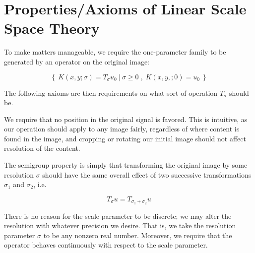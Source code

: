     \section{Properties/Axioms of Linear Scale Space Theory}
	 To make matters manageable, we require the one-parameter family to be generated by an operator on the original image:
	 
	\begin{equation}
		\left\{\ K(x,y;\sigma) = T_\sigma u_0
		\ \lvert \ 
		\sigma \ge 0
		\; ,\; K(x,y,;0) = u_0
		\ \right\} 
	\end{equation}
    
	The following axioms are then requirements on what sort of operation $T_\sigma$ should be.
		
    \begin{axiom}
    	\label{axiom:linear-shift-and-rotation}
    We require that no position in the original signal is favored.  This is intuitive, as our operation should apply to any image fairly, regardless of where content is found in the image, and cropping or rotating our initial image should not affect resolution of the content.
\end{axiom}
   
     \begin{axiom} \label{axiom:semigroup}
   	The semigroup property is simply that transforming
   	the original image by some resolution $\sigma$ should
   	have the same overall effect of two successive
   	transformations $\sigma_1$ and $\sigma_2$, i.e.
   	
   	\begin{equation}	
   	T_{\sigma} u = T_{\sigma_1 + \sigma_2} u
   	\end{equation}
   \end{axiom}
 
    \begin{axiom}
    	\label{axiom:continuity} There is no reason for the scale parameter to be discrete; we may alter the resolution with whatever precision we desire. That is, we take the resolution
    parameter $\sigma$ to be any nonzero real number. Moreover, we require that the operator behaves continuously with respect to the scale parameter.
        \end{axiom}
    
	
